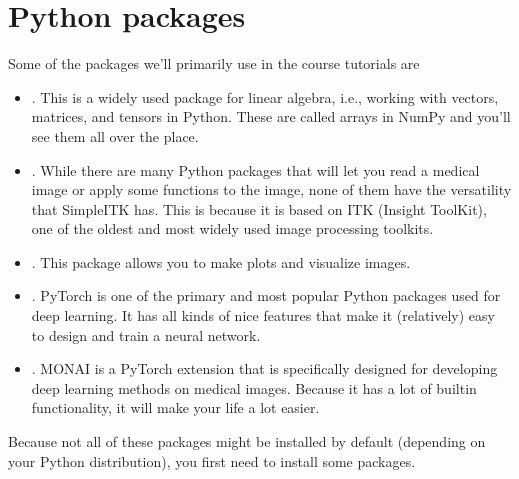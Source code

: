 \documentclass[letterpaper,10pt,english]{jupyterBook}
\begin{document}
\section{Python packages}
\label{\detokenize{notebooks/Tutorial1_NumpySimpleITK/Tutorial1_NumpySimpleITK_student:python-packages}}
\sphinxAtStartPar
Some of the packages we’ll primarily use in the course tutorials are
\begin{itemize}
\item {} 
\sphinxAtStartPar
{}. This is a widely used package for linear algebra, i.e., working with vectors, matrices, and tensors in Python. These are called arrays in NumPy and you’ll see them all over the place.

\item {} 
\sphinxAtStartPar
{}. While there are many Python packages that will let you read a medical image or apply some functions to the image, none of them have the versatility that SimpleITK has. This is because it is based on ITK (Insight ToolKit), one of the oldest and most widely used image processing toolkits.

\item {} 
\sphinxAtStartPar
{}. This package allows you to make plots and visualize images.

\item {} 
\sphinxAtStartPar
{}. PyTorch is one of the primary and most popular Python packages used for deep learning. It has all kinds of nice features that make it (relatively) easy to design and train a neural network.

\item {} 
\sphinxAtStartPar
{}. MONAI is a PyTorch extension that is specifically designed for developing deep learning methods on medical images. Because it has a lot of built\sphinxhyphen{}in functionality, it will make your life a lot easier.

\end{itemize}

\sphinxAtStartPar
Because not all of these packages might be installed by default (depending on your Python distribution),  you first need to install some packages.
\end{document}
